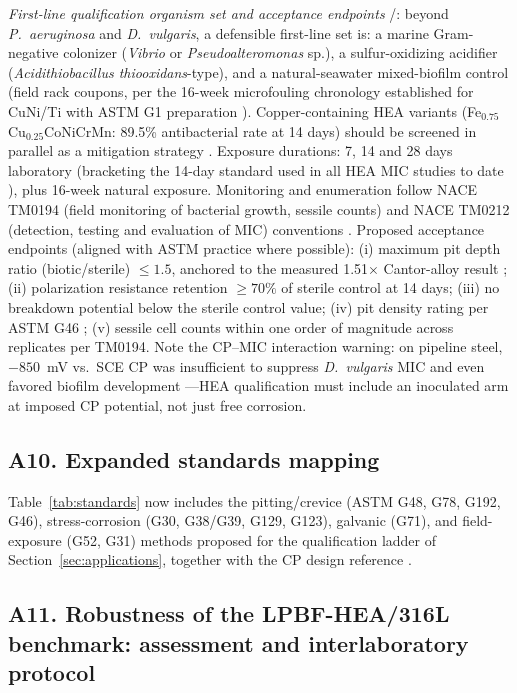 \emph{First-line qualification organism set and acceptance endpoints} \evid{}/\prop{}: beyond \emph{P.~aeruginosa} and \emph{D.~vulgaris}, a defensible first-line set is: a marine Gram-negative colonizer (\emph{Vibrio} or \emph{Pseudoalteromonas} sp.), a sulfur-oxidizing acidifier (\emph{Acidithiobacillus thiooxidans}-type), and a natural-seawater mixed-biofilm control (field rack coupons, per the 16-week microfouling chronology established for CuNi/Ti with ASTM G1 preparation \cite{vadde2025}). Copper-containing HEA variants (Fe$_{0.75}$Cu$_{0.25}$CoNiCrMn: 89.5\% antibacterial rate at 14 days) should be screened in parallel as a mitigation strategy \cite{lou2024cuhea,antimic_hea_review2025}. Exposure durations: 7, 14 and 28 days laboratory (bracketing the 14-day standard used in all HEA MIC studies to date \cite{lou2020mic,mic_cantor2022,wang2023srb}), plus 16-week natural exposure. Monitoring and enumeration follow NACE TM0194 (field monitoring of bacterial growth, sessile counts) and NACE TM0212 (detection, testing and evaluation of MIC) conventions \cite{nace_tm0194,nace_tm0212,mic_pipeline2026}. Proposed acceptance endpoints \prop{} (aligned with ASTM practice where possible): (i) maximum pit depth ratio (biotic/sterile) $\leq 1.5$, anchored to the measured 1.51$\times$ Cantor-alloy result \cite{mic_cantor2022}; (ii) polarization resistance retention $\geq 70\%$ of sterile control at 14 days; (iii) no breakdown potential below the sterile control value; (iv) pit density rating per ASTM G46 \cite{astm_g46}; (v) sessile cell counts within one order of magnitude across replicates per TM0194. Note the CP--MIC interaction warning: on pipeline steel, $-850$~mV vs.\ SCE CP was insufficient to suppress \emph{D.~vulgaris} MIC and even favored biofilm development \cite{mic_pipeline2026}---HEA qualification must include an inoculated arm at imposed CP potential, not just free corrosion.

\subsection{A10. Expanded standards mapping}
\label{sec:a10}

Table~\ref{tab:standards} now includes the pitting/crevice (ASTM G48, G78, G192, G46), stress-corrosion (G30, G38/G39, G129, G123), galvanic (G71), and field-exposure (G52, G31) methods proposed for the qualification ladder of Section~\ref{sec:applications}, together with the CP design reference \cite{dnv_rpb401}.

\subsection{A11. Robustness of the LPBF-HEA/316L benchmark: assessment and interlaboratory protocol}
\label{sec:a11}

